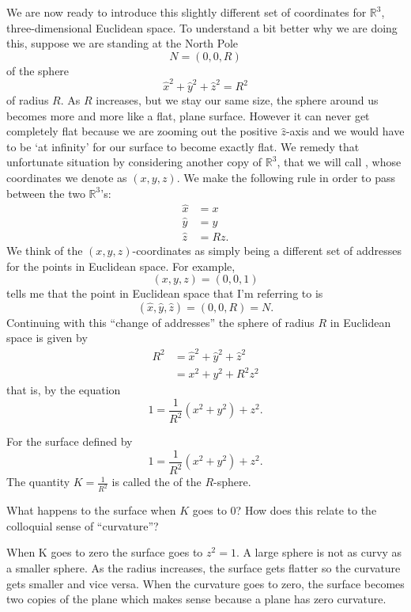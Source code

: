 \documentclass[newpage,hints,handout]{ximera}
\begin{document}
We are now ready to introduce this slightly different set of coordinates for
$\mathbb{R}^{3}$, three-dimensional Euclidean space. To understand a bit better why we are doing this,
suppose we are standing at the North Pole%
\[
N=(0,0,R)
\]
of the sphere%
\[
\hat{x}^{2}+\hat{y}^{2}+\hat{z}^{2}=R^{2} %
\]
of radius $R$. As $R$ increases, but we stay our same size, the sphere
around us becomes more and more like a flat, plane surface. However it
can never get completely flat because we are zooming out the positive
$\hat{z}$-axis and we would have to be `at infinity' for our surface
to become exactly flat. We remedy that unfortunate situation by
considering another copy of $\mathbb{R}^{3}$, that we will call
, whose coordinates we denote as
$\left( x,y,z\right) $.  We make the following rule in order to pass
between the two $\mathbb{R}^{3}$'s:%
\begin{align*}
\hat{x}  &  =x\\
\hat{y}  &  =y\\
\hat{z}  &  =Rz.
\end{align*}
We think of the $\left( x,y,z\right) $-coordinates as simply being a
different set of addresses for the points in Euclidean space. For
example,
\[
\left(x,y,z\right)  =\left(0,0,1\right)
\]
tells me that the point in Euclidean space that I'm referring to is%
\[
\left(\hat{x},\hat{y},\hat{z}\right) =\left( 0,0,R\right)= N.
\]
Continuing with this ``change of addresses'' the sphere of radius $R$
in Euclidean space is given by
\begin{align*}
R^{2} & =\hat{x}^{2}+\hat{y}^{2}+\hat{z}^{2}\\ &
=x^{2}+y^{2}+R^{2}z^{2}
\end{align*}
that is, by the equation
\[
1=\frac{1}{R^{2}}\left(  x^{2}+y^{2}\right)  +z^{2}. %
\]
\begin{definition}
  For the surface defined by
  \[
  1=\frac{1}{R^{2}}\left(  x^{2}+y^{2}\right)  +z^{2}. %
  \]
The quantity $K=\frac{1}{R^{2}}$ is called the  of the
$R$-sphere.
\end{definition}

\begin{problem}
  What happens to the surface when $K$ goes to $0$?  How does this relate to the
  colloquial sense of ``curvature''?
  
\begin{freeResponse}
When K goes to zero the surface goes to $z^{2} =1$.  A large sphere is not as curvy as a smaller sphere. As the radius increases, the surface gets flatter so the curvature gets smaller and vice versa.  When the curvature goes to zero, the surface becomes two copies of the plane which makes sense because a plane has zero curvature.  
\end{freeResponse}

\end{problem}
\end{document}

